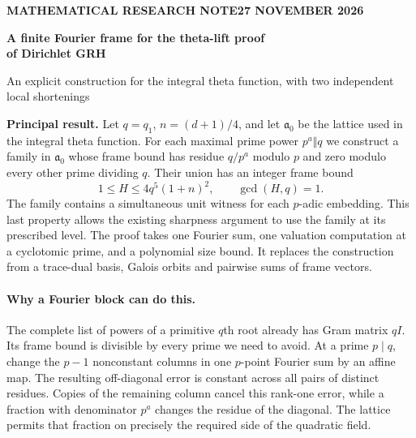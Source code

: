 \documentclass[11pt,letterpaper]{article}
\newcommand{\headnote}[1]{{\small\sffamily\bfseries\color{accent}#1}\par\smallskip}
\begin{document}
\thispagestyle{plain}
\headnote{MATHEMATICAL RESEARCH NOTE\hfill 27 NOVEMBER 2026}
{\LARGE\bfseries\color{ink} A finite Fourier frame for the theta-lift proof\\ of Dirichlet GRH\par}
\vspace{3pt}
{\large An explicit construction for the integral theta function, with two independent local shortenings\par}
\vspace{6pt}
\textbf{Principal result.} Let $q=q_1$, $n=(d+1)/4$, and let $\mathfrak a_0$ be the lattice used in the integral theta function. For each maximal prime power $p^a\Vert q$ we construct a family in $\mathfrak a_0$ whose frame bound has residue $q/p^a$ modulo $p$ and zero modulo every other prime dividing $q$. Their union has an integer frame bound
\[
        1\le H\le 4q^5(1+n)^2,\qquad \gcd(H,q)=1.
\]
The family contains a simultaneous unit witness for each $p$-adic embedding. This last property allows the existing sharpness argument to use the family at its prescribed level. The proof takes one Fourier sum, one valuation computation at a cyclotomic prime, and a polynomial size bound. It replaces the construction from a trace-dual basis, Galois orbits and pairwise sums of frame vectors.

\paragraph{Why a Fourier block can do this.}
The complete list of powers of a primitive $q$th root already has Gram matrix $qI$. Its frame bound is divisible by every prime we need to avoid. At a prime $p\mid q$, change the $p-1$ nonconstant columns in one $p$-point Fourier sum by an affine map. The resulting off-diagonal error is constant across all pairs of distinct residues. Copies of the remaining column cancel this rank-one error, while a fraction with denominator $p^a$ changes the residue of the diagonal. The lattice permits that fraction on precisely the required side of the quadratic field.
\end{document}
